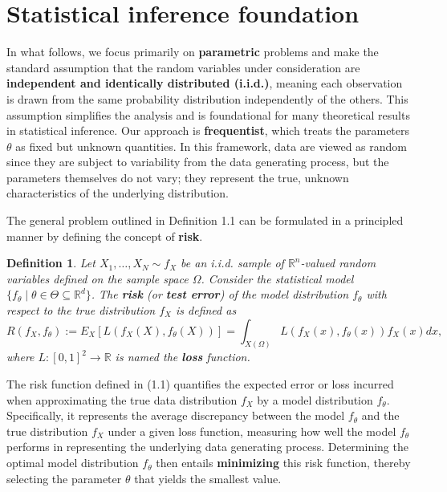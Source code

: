 \documentclass{report}
\newtheorem{definition}{Definition}[chapter]
\begin{document}
\section{Statistical inference foundation}
In what follows, we focus primarily on \textbf{parametric} problems and make the standard assumption that the random variables under consideration are \textbf{independent and identically distributed (i.i.d.)}, meaning each observation is drawn from the same probability distribution independently of the others. This assumption simplifies the analysis and is foundational for many theoretical results in statistical inference. Our approach is \textbf{frequentist}, which treats the parameters $\theta$ as fixed but unknown quantities. In this framework, data are viewed as random since they are subject to variability from the data generating process, but the parameters themselves do not vary; they represent the true, unknown characteristics of the underlying distribution.

The general problem outlined in Definition 1.1 can be formulated in a principled manner by defining the concept of \textbf{risk}.

\begin{definition}
Let $X_1,\dots,X_N \sim f_X$ be an i.i.d. sample of $\mathbb{R}^n$-valued random variables defined on the sample space $\Omega$. Consider the statistical model $\{f_\theta \mid\theta\in\Theta\subseteq\mathbb{R}^d\}$. The \textbf{risk} (or \textbf{test error}) of the model distribution $f_\theta$ with respect to the true distribution $f_X$ is defined as
\begin{equation}
R(f_X,f_\theta) := E_X[L(f_X(X),f_\theta(X))] = \int_{X(\Omega)} L(f_X(x),f_\theta(x))f_X(x)dx,
\end{equation}
where $L : [0,1]^2 \to \mathbb{R}$ is named the \textbf{loss} function.
\end{definition}

The risk function defined in (1.1) quantifies the expected error or loss incurred when approximating the true data distribution $f_X$ by a model distribution $f_\theta$. Specifically, it represents the average discrepancy between the model $f_\theta$ and the true distribution $f_X$ under a given loss function, measuring how well the model $f_\theta$ performs in representing the underlying data generating process. Determining the optimal model distribution $f_\theta$ then entails \textbf{minimizing} this risk function, thereby selecting the parameter $\theta$ that yields the smallest value.
\end{document}
